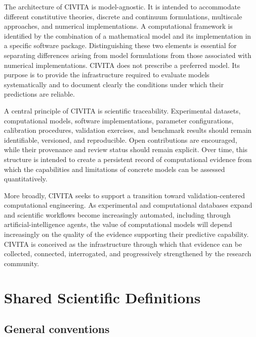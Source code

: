 \documentclass[11pt]{book}
\begin{document}
The architecture of CIVITA is model-agnostic. It is intended to accommodate different constitutive theories, discrete and continuum formulations, multiscale approaches, and numerical implementations. A computational framework is identified by the combination of a mathematical model and its implementation in a specific software package. Distinguishing these two elements is essential for separating differences arising from model formulations from those associated with numerical implementations. CIVITA does not prescribe a preferred model. Its purpose is to provide the infrastructure required to evaluate models systematically and to document clearly the conditions under which their predictions are reliable.

A central principle of CIVITA is scientific traceability. Experimental datasets, computational models, software implementations, parameter configurations, calibration procedures, validation exercises, and benchmark results should remain identifiable, versioned, and reproducible. Open contributions are encouraged, while their provenance and review status should remain explicit. Over time, this structure is intended to create a persistent record of computational evidence from which the capabilities and limitations of concrete models can be assessed quantitatively.

More broadly, CIVITA seeks to support a transition toward validation-centered computational engineering. As experimental and computational databases expand and scientific workflows become increasingly automated, including through artificial-intelligence agents, the value of computational models will depend increasingly on the quality of the evidence supporting their predictive capability. CIVITA is conceived as the infrastructure through which that evidence can be collected, connected, interrogated, and progressively strengthened by the research community.




    
    \chapter{Shared Scientific Definitions}
\section{General conventions}
\end{document}
